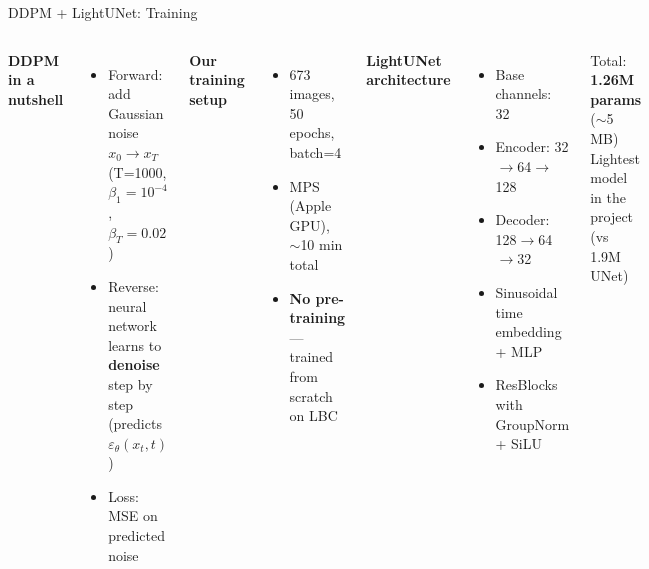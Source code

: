 \documentclass[english,10pt]{beamer}
\begin{document}
\begin{frame}{DDPM + LightUNet: Training}
  \begin{columns}[t]
      \textbf{DDPM in a nutshell}\\[0.08cm]
      \small
      \begin{itemize}
        \item Forward: add Gaussian noise $x_0 \to x_T$ \\ (T=1000, $\beta_1=10^{-4}$, $\beta_T=0.02$)
        \item Reverse: neural network learns to \textbf{denoise} step by step \\ (predicts $\varepsilon_\theta(x_t,t)$)
        \item Loss: MSE on predicted noise
      \end{itemize}

      \vspace{0.25cm}
      \textbf{Our training setup}\\[0.08cm]
      \small
      \begin{itemize}
        \item 673 images, 50 epochs, batch=4
        \item MPS (Apple GPU), $\sim$10 min total
        \item \textbf{No pre-training} --- trained from scratch on LBC
      \end{itemize}

      \textbf{LightUNet architecture}\\[0.08cm]
      \small
      \begin{itemize}
        \item Base channels: 32
        \item Encoder: 32$\to$64$\to$128
        \item Decoder: 128$\to$64$\to$32
        \item Sinusoidal time embedding + MLP
        \item ResBlocks with GroupNorm + SiLU
      \end{itemize}

      \vspace{0.15cm}
      \begin{block}{\centering\small Total: \textbf{1.26M params} ($\sim$5 MB)}
        \centering\scriptsize Lightest model in the project (vs 1.9M UNet)
      \end{block}
  \end{columns}
\end{frame}
\end{document}
